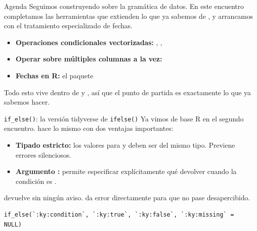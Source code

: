 \documentclass[8pt]{beamer}
\begin{document}
	\subtitle{6to encuentro: Manipulación de datos III}

	\begin{frame}[plain]
		\maketitle
	\end{frame}


	\begin{frame}[fragile]{Agenda}
		Seguimos construyendo sobre la gramática de datos. En este encuentro completamos las herramientas que extienden lo que ya sabemos de , y arrancamos con el tratamiento especializado de fechas.

		\begin{itemize}
			\item \textbf{Operaciones condicionales vectorizadas:} , , 
			\item \textbf{Operar sobre múltiples columnas a la vez:} 
			\item \textbf{Fechas en R:} el paquete 
		\end{itemize}

		Todo esto vive dentro de  y , así que el punto de partida es exactamente lo que ya sabemos hacer.
	\end{frame}



	\begin{frame}[fragile]{\texttt{if\_else()}: la versión tidyverse de \texttt{ifelse()}}
		Ya vimos  de base R en el segundo encuentro.  hace lo mismo con dos ventajas importantes:

		\begin{itemize}
			\item \textbf{Tipado estricto:} los valores para  y  deben ser del mismo tipo. Previene errores silenciosos.
			\item \textbf{Argumento :} permite especificar explícitamente qué devolver cuando la condición es .
		\end{itemize}

		\begin{alertblock}{}
			 devuelve  sin ningún aviso.  da error directamente para que no pase desapercibido.
		\end{alertblock}

\begin{lstlisting}[style=RScript]
if_else(`:ky:condition`, `:ky:true`, `:ky:false`, `:ky:missing` = NULL)
\end{lstlisting}
	\end{frame}
\end{document}
